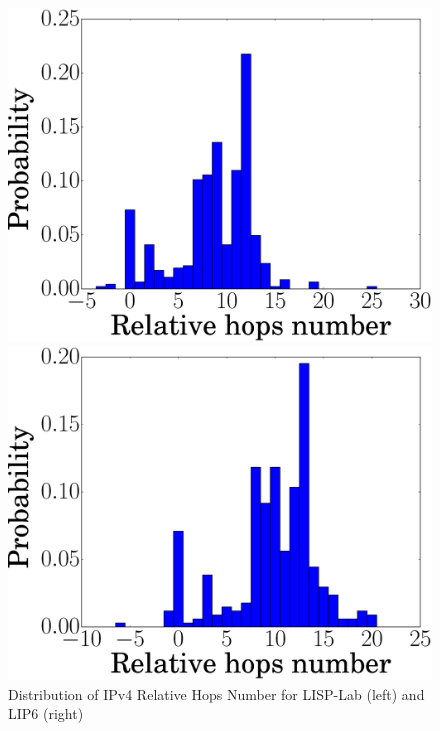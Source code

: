 \begin{figure}[!t]
	\begin{minipage}[c]{.49\linewidth}
		\begin{center}
			\includegraphics[width=\textwidth]{Pics/v4/Relative_hops_num_LISP-Lab-FranceIX_hist_changed_60.eps}
		\end{center}
	\end{minipage}
	\begin{minipage}[c]{.49\linewidth}
		\begin{center}
			\includegraphics[width=\textwidth]{Pics/v4/Relative_hops_num_LIP6-FranceIX_hist_changed_60.eps}
		\end{center}
	\end{minipage}
	\vspace{-0.5mm}
	\caption{Distribution of IPv4 Relative Hops Number for LISP-Lab (left) and LIP6 (right)}
	\label{Distribution_v4_relative_hops_num_proporation_LISP-Lab_LIP6}
\end{figure}

